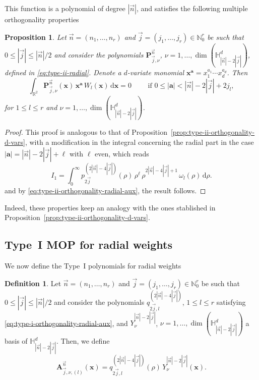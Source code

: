\documentclass[a4paper]{article}
\theoremstyle{plain}
\newtheorem{proposition}[theorem]{Proposition}
\theoremstyle{definition}
\newtheorem{definition}[theorem]{Definition}
\newcommand{\NN}{\mathbb{N}}
\newcommand{\dr}{\mathrm{d}}
\begin{document}
    This function is a polynomial of degree $|\vec n|$, and satisfies the following multiple orthogonality properties
    \begin{proposition}
        Let $\vec n = (n_1,\dots,n_r)$ and $\vec j = (j_1,\dots,j_r)\in\NN_0^r$ be such that  $0\leq |\vec j| \leq |\vec n|/2$ and consider the polynomials $\mathbf P_{\vec j,\nu}^{\vec n}$, $\nu=1,\dots,\dim(\mathbb H_{|\vec n|-2|\vec j|}^d)$, defined in \eqref{eq:type-ii-radial}. Denote a $d$-variate monomial $\mathbf x^{\mathbf a}=x_1^{a_1}\cdots x_d^{a_d}$. Then
        \begin{equation}
        \label{eq:type-ii-orthogonality-radial}
            \int_{\mathbb R^2}\mathbf P_{\vec j,\nu}^{\vec n}(\mathbf x)\,\mathbf x^{\mathbf a} \,  W_l(\mathbf x)\, \dr \mathbf x = 0\qquad\text{ if }0\leq |\mathbf a|< |\vec n|-2|\vec j|+2j_l,
        \end{equation}
        for $1\leq l\leq r$ and $\nu=1,\dots,\dim(\mathbb H_{|\vec n|-2|\vec j|}^d)$.
    \end{proposition}
    \begin{proof}
        This proof is analogous to that of Proposition~\ref{prop:type-ii-orthogonality-d-vars}, with a modification in the integral concerning the radial part in the case $|\mathbf a|=|\vec n|-2|\vec j|+\ell$ with $\ell$ even, which reads
        $$
        I_1=\int_0^\infty p_{2\vec j}^{(2|\vec n|-4|\vec j|)}(\rho)\,\rho^\ell\,\rho^{2|\vec n|-4|\vec j|+1}\, \omega_l(\rho)\,\dr\rho.
        $$
        and by \eqref{eq:type-ii-orthogonality-radial-aux}, the result follows.
    \end{proof}
    
    Indeed, these properties keep an analogy with the ones stablished in Proposition~\ref{prop:type-ii-orthogonality-d-vars}.

    \subsection{Type~I MOP for radial weights}
    
    We now define the Type~I polynomials for radial weights

    \begin{definition} Let $\vec n = (n_1,\dots,n_r)$ and $\vec j = (j_1,\dots,j_r)\in\NN_0^r$ be such that  $0\leq |\vec j| \leq |\vec n|/2$ and consider the polynomials $q_{2\vec j,l}^{(2|\vec n|-4|\vec j|)}$, $1\leq l\leq r$ satisfying \eqref{eq:type-i-orthogonality-radial-aux}, and  $Y_\nu^{|\vec n|-2|\vec j|}$, $\nu=1,\dots,\dim(\mathbb H_{|\vec n|-2|\vec j|}^d)$ a basis of $\mathbb H_{|\vec n|-2|\vec j|}^d$. Then, we define
    \begin{equation}
        \label{eq:type-i-radial}
        \mathbf A^{\vec n}_{\vec j,\nu,(l)}(\mathbf x) = q^{(2|\vec n|-4|\vec j|)}_{2\vec j, l}(\rho)\, Y_\nu^{|\vec n|-2|\vec j|}(\mathbf x).
    \end{equation}
        
    \end{definition}
\end{document}
